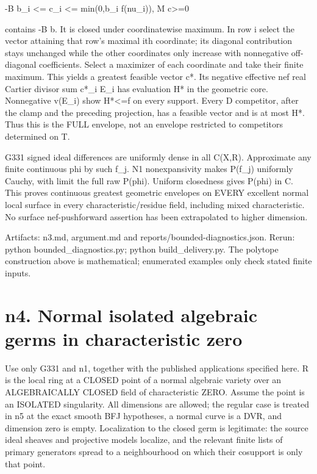 \documentclass[11pt]{article}
\begin{document}
    -B b\_i <= c\_i <= min(0,b\_i f(nu\_i)),   M c>=0

contains -B b. It is closed under coordinatewise maximum. In row i select the vector attaining that row's maximal ith coordinate; its diagonal contribution stays unchanged while the other coordinates only increase with nonnegative off-diagonal coefficients. Select a maximizer of each coordinate and take their finite maximum. This yields a greatest feasible vector c*. Its negative effective nef real Cartier divisor sum c*\_i E\_i has evaluation H* in the geometric core. Nonnegative v(E\_i) show H*<=f on every support. Every D competitor, after the clamp and the preceding projection, has a feasible vector and is at most H*. Thus this is the FULL envelope, not an envelope restricted to competitors determined on T.

G331 signed ideal differences are uniformly dense in all C(X,R). Approximate any finite continuous phi by such f\_j. N1 nonexpansivity makes P(f\_j) uniformly Cauchy, with limit the full raw P(phi). Uniform closedness gives P(phi) in C. This proves continuous greatest geometric envelopes on EVERY excellent normal local surface in every characteristic/residue field, including mixed characteristic. No surface nef-pushforward assertion has been extrapolated to higher dimension.

Artifacts: n3.md, argument.md and reports/bounded-diagnostics.json. Rerun: python bounded\_diagnostics.py; python build\_delivery.py. The polytope construction above is mathematical; enumerated examples only check stated finite inputs.


\section*{n4. Normal isolated algebraic germs in characteristic zero}

Use only G331 and n1, together with the published applications specified here. R is the local ring at a CLOSED point of a normal algebraic variety over an ALGEBRAICALLY CLOSED field of characteristic ZERO. Assume the point is an ISOLATED singularity. All dimensions are allowed; the regular case is treated in n5 at the exact smooth BFJ hypotheses, a normal curve is a DVR, and dimension zero is empty. Localization to the closed germ is legitimate: the source ideal sheaves and projective models localize, and the relevant finite lists of primary generators spread to a neighbourhood on which their cosupport is only that point.
\end{document}

